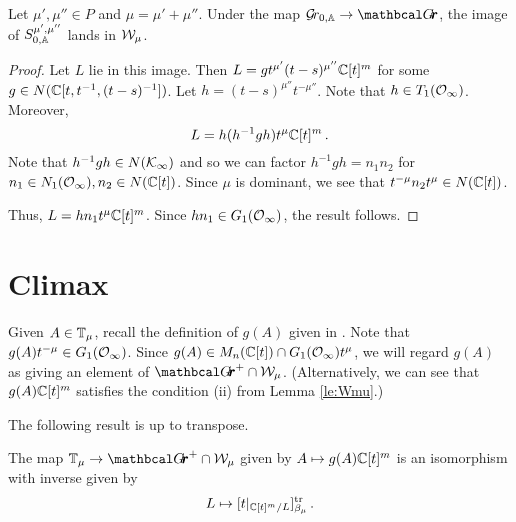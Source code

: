 \documentclass[draft]{article}
\begin{document}
% 
\begin{lemma}
    Let $\mu',\mu'' \in P$ and $\mu = \mu' + \mu''$. Under the map $ \Grbd \rightarrow \Grth$, the image of $ S^{\mu', \mu''}_{0,\AA}$ lands in $ \cW_\mu$.
\end{lemma}

\begin{proof}
    Let $ L $ lie in this image.  Then $ L = g t^{\mu'} (t-s)^{\mu''}\CC[t]^m$ for some $ g \in N(\CC[t, t^{-1}, (t-s)^{-1}]) $.  Let $ h =(t-s)^{\mu''} t^{-\mu''}  $.  Note that $ h \in T_1(\Oinf)$. 
    Moreover,
    $$ L = h (h^{-1} g h) t^{\mu}\CC[t]^m\,. $$
    Note that 
    $h^{-1} g h \in N(\cK_\infty)$ and so we can factor $ h^{-1} g h = n_1 n_2$ for $ n_1 \in N_1(\Oinf), n_2 \in N(\CC[t]) $.  Since $ \mu $ is dominant, we see that $ t^{-\mu} n_2 t^\mu \in N(\CC[t]) $. %

    
    
    Thus, $ L = h n_1 t^\mu \CC[t]^m$.  Since $ hn_1 \in G_1(\Oinf)$, the result follows. %
    \end{proof}

\section{Climax}
Given $ A \in \TT_\mu$, recall the definition of $ g(A)$ given in .  Note that $g(A)t^{-\mu} \in G_1(\Oinf)$.
Since $ g(A) \in M_n(\CC[t]) \cap G_1(\Oinf)t^\mu$, we will regard $ g(A)$ as giving an element of $ \Grth^+ \cap \cW_\mu$.  (Alternatively, we can see that $ g(A) \CC[t]^m$ satisfies the condition (ii) from Lemma \ref{le:Wmu}.)

The following result is \cite[Theorem 3.2]{cautis2018categorical} up to transpose.
% 
\begin{theorem} \label{th:TmuWmu}
The map $ \TT_\mu \rightarrow \Grth^+ \cap \cW_\mu $ given by $ A \mapsto g(A)\CC[t]^m $ is an isomorphism with inverse given by
$$ L \mapsto [t|_{\CC[t]^m/L} ]^{\tr}_{\beta_\mu} \,. $$
\end{theorem}
% 
\end{document}
